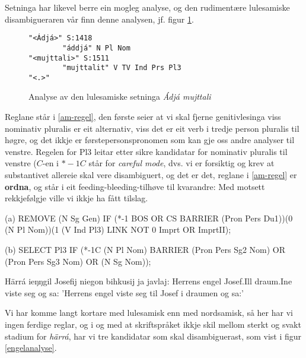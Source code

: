 \documentclass[a4paper,norsk]{article}
\begin{document}
Setninga har likevel berre ein mogleg analyse, og den rudimentære lulesamiske disambigueraren vår finn denne analysen, jf. figur \ref{am}. %

\begin{figure}[htbp]
\begin{center}
\begin{verbatim}
"<Ádjá>" S:1418
        "áddjá" N Pl Nom
"<mujttali>" S:1511
        "mujttalit" V TV Ind Prs Pl3
"<.>"
\end{verbatim}
\caption{Analyse av den lulesamiske setninga \textit{Ádjá mujttali}}
\label{am}
\end{center}
\end{figure}

Reglane står i \ref{am-regel}, den første seier at vi skal fjerne genitivlesinga viss nominativ pluralis er eit alternativ, viss det er eit verb i tredje person pluralis til høgre, og det ikkje er førstepersonspronomen som kan gje  oss andre analyser til venstre. Regelen for Pl3 leitar etter sikre kandidatar for nominativ pluralis til venstre ($C$-en i $*-1C$ står for \textit{careful mode}, dvs. vi er forsiktig og krev at substantivet allereie skal vere disambiguert, og det er det, reglane i \ref{am-regel} er \textbf{ordna}, og står i eit feeding-bleeding-tilhøve til kvarandre: Med motsett rekkjefølgje ville vi ikkje ha fått tilslag. %

\begin{example}\label{am-regel}
\item[(a)] REMOVE (N Sg Gen) IF (*-1 BOS OR CS BARRIER (Pron Pers Du1))(0 (N Pl Nom))(1 (V Ind Pl3) LINK NOT 0 Imprt OR ImprtII);
\item[(b)] SELECT Pl3 IF (*-1C (N Pl Nom) BARRIER (Pron Pers Sg2 Nom) OR  (Pron Pers Sg3 Nom) OR (N Sg Nom));
\end{example}



\begin{example}\label{engel}
\gll Härrá ieŋŋgil Josefij niegon bihkusij ja javlaj:
    Herrens engel Josef.Ill draum.Ine {viste seg} og sa:
\glt 'Herrens engel viste seg til Josef i draumen og sa:' 
\glend    
\end{example}

Vi har komme langt kortare med lulesamisk enn med nordsamisk, så her har vi ingen ferdige reglar, og i og med at skriftspråket ikkje skil mellom sterkt og svakt stadium for \textit{härrá}, har vi tre kandidatar som skal disambiguerast, som vist i figur \ref{engelanalyse}. %
\end{document}
